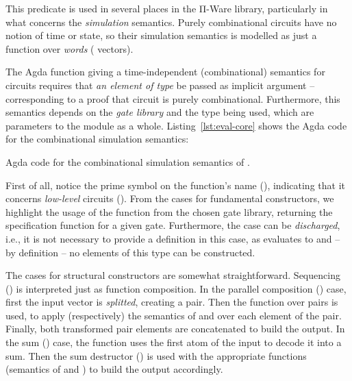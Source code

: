             This predicate is used in several places in the Π-Ware library, particularly in what concerns
            the \emph{simulation} semantics.
            Purely combinational circuits have no notion of time or state, so their simulation semantics
            is modelled as just a function over \emph{words} ( vectors).

            The Agda function giving a time-independent (combinational) semantics for circuits requires that
            \emph{an element of type  } be passed as implicit argument – corresponding
            to a proof that circuit  is purely combinational.
            Furthermore, this semantics depends on the \emph{gate library} and the
             type being used, which are parameters to the  module as a whole.
            Listing~\ref{lst:eval-core} shows the Agda code for the combinational simulation semantics:

            \begin{listing}[h]
                \caption{Agda code for the combinational simulation semantics of .\label{lst:eval-core}}
            \end{listing}

            First of all, notice the prime symbol on the function's name (),
            indicating that it concerns \emph{low-level} circuits ().
            From the cases for fundamental constructors, we highlight the usage of the 
            function from the chosen gate library, returning the specification function for a given gate.
            Furthermore, the  case can be \emph{discharged}, i.e.,
            it is not necessary to provide a definition in this case,
            as  \AY{(} \AY{)} evaluates to 
            and – by definition – no elements of this type can be constructed.

            The cases for structural constructors are somewhat straightforward.
            Sequencing () is interpreted just as function composition.
            In the parallel composition () case, first the input vector is \emph{splitted}, creating a pair.
            Then the  function over pairs is used, to apply (respectively) the semantics of 
            and  over each element of the pair.
            Finally, both transformed pair elements are concatenated to build the output.
            In the sum () case, the  function uses the first atom of the input
            to decode it into a sum.
            Then the sum destructor () is used with the appropriate functions
            (semantics of  and ) to build the output accordingly.

